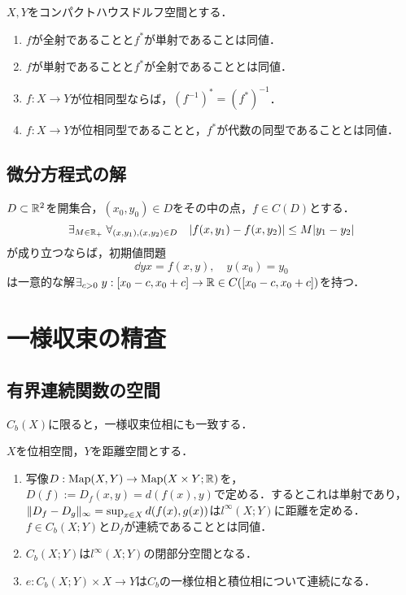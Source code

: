 \documentclass[uplatex,dvipdfmx]{jsreport}
\begin{document}
\begin{theorem}
    $X,Y$をコンパクトハウスドルフ空間とする．
    \begin{enumerate}
        \item $f$が全射であることと$f^*$が単射であることは同値．
        \item $f$が単射であることと$f^*$が全射であることとは同値．
        \item $f:X\to Y$が位相同型ならば，$(f^{-1})^*=(f^*)^{-1}$．
        \item $f:X\to Y$が位相同型であることと，$f^*$が代数の同型であることとは同値．
    \end{enumerate}
\end{theorem}

\subsection{微分方程式の解}

\begin{theorem}
    $D\subset\mathbb{R}^2$を開集合，$(x_0,y_0)\in D$をその中の点，$f\in C(D)$とする．
    \[\exists_{M\in\mathbb{R}_+}\;\forall_{(x,y_1),(x,y_2)\in D}\quad\lvert f(x,y_1)-f(x,y_2)\rvert\le M\lvert y_1-y_2\rvert\]
    が成り立つならば，初期値問題
    \[\dd{y}{x}=f(x,y),\quad y(x_0)=y_0\]
    は一意的な解$\exists_{c>0}\;y:[x_0-c,x_0+c]\to\mathbb{R}\in C([x_0-c,x_0+c])$を持つ．
\end{theorem}

\section{一様収束の精査}

\subsection{有界連続関数の空間}

\begin{tcolorbox}[colframe=ForestGreen, colback=ForestGreen!10!white,breakable,colbacktitle=ForestGreen!40!white,coltitle=black,fonttitle=\bfseries\sffamily,
title=]
    $C_b(X)$に限ると，一様収束位相にも一致する．
\end{tcolorbox}

\begin{proposition}
    $X$を位相空間，$Y$を距離空間とする．
    \begin{enumerate}
        \item 写像$D:\mathrm{Map}(X,Y)\to\mathrm{Map}(X\times Y;\mathbb{R})$を，$D(f):=D_f(x,y)=d(f(x),y)$で定める．するとこれは単射であり，$\|D_f-D_g\|_\infty=\sup_{x\in X}d(f(x),g(x))$は$l^\infty(X;Y)$に距離を定める．$f\in C_b(X;Y)$と$D_f$が連続であることとは同値．
        \item $C_b(X;Y)$は$l^\infty(X;Y)$の閉部分空間となる．
        \item $e:C_b(X;Y)\times X\to Y$は$C_b$の一様位相と積位相について連続になる．
    \end{enumerate}
\end{proposition}
\end{document}
